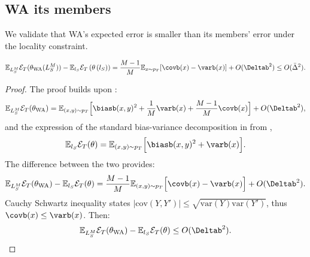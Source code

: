 \subsection{WA \versus its members}
\label{app:proof_wa_ind}
We validate that WA's expected error is smaller than its members' error under the locality constraint.
\begin{lemma}\label{lemma:wa_ind}
    \begin{equation}
        \mathbb{E}_{L_S^M}\mathcal{E}_T(\theta_{\text{WA}}(L_S^M)) - \mathbb{E}_{l_S} \mathcal{E}_T \left(\theta \left( l_S \right) \right)= \frac{M-1}{M} \mathbb{E}_{x\sim p_T}[\covb(x)-\varb(x)] + O(\Deltab^2) \leq O(\bar{\Delta}^2).%
    \end{equation}%
\end{lemma}%
\begin{proof}
    The proof builds upon :
    \begin{equation*}
        \mathbb{E}_{L_S^M}\mathcal{E}_T(\theta_{\text{WA}}) = \mathbb{E}_{(x,y)\sim p_T}\Big[\biasb(x,y)^{2}+\frac{1}{M} \varb(x)+\frac{M-1}{M} \covb(x)\Big] + O(\Deltab^2),
    \end{equation*}
    and the expression of the standard bias-variance decomposition in  from \cite{kohavi1996bias},
    \begin{equation*}
        \mathbb{E}_{l_S}\mathcal{E}_T(\theta) = \mathbb{E}_{(x,y)\sim p_T}\Big[\biasb(x,y)^{2}+\varb(x)\Big].
    \end{equation*}
    The difference between the two provides:
    \begin{equation*}
        \mathbb{E}_{L_S^M}\mathcal{E}_T(\theta_{\text{WA}}) - \mathbb{E}_{l_S}\mathcal{E}_T(\theta) = \frac{M-1}{M} \mathbb{E}_{(x,y)\sim p_T} \Big[\covb(x)-\varb(x)\Big] + O(\Deltab^2).
    \end{equation*}
    Cauchy Schwartz inequality states $|\mathrm{cov}(Y, Y')| \leq \sqrt{\mathrm{var}(Y) \mathrm{var}(Y')}$, thus $\covb(x)\leq\varb(x)$. Then:
    \begin{equation*}
        \mathbb{E}_{L_S^M}\mathcal{E}_T(\theta_{\text{WA}}) - \mathbb{E}_{l_S}\mathcal{E}_T(\theta) \leq O(\Deltab^2).
    \end{equation*}
\end{proof}